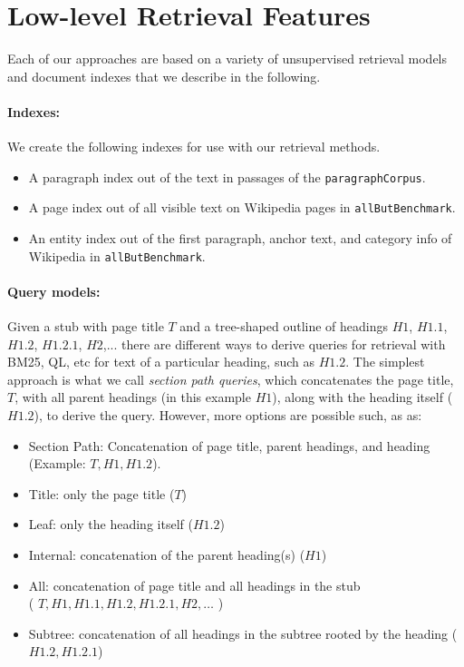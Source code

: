 \documentclass{article}
\begin{document}
\section{Low-level Retrieval Features}
\label{sec:low-level}

Each of our approaches are based on a variety of unsupervised retrieval models and document indexes that we describe in the following.

\paragraph{Indexes:}

We create the following indexes for use with our retrieval methods. 
\begin{itemize}
    \item A paragraph index out of the text in passages of the \texttt{paragraphCorpus}.
    \item A page index out of all visible text on Wikipedia pages in \texttt{allButBenchmark}. 
    \item An entity index out of the first paragraph, anchor text, and category info of Wikipedia in \texttt{allButBenchmark}.
\end{itemize}



\paragraph{Query models:}
Given a stub with page title $T$ and a tree-shaped outline of headings $H1$, $H1.1$, $H1.2$, $H1.2.1$, $H2$,... there are different ways to derive queries for retrieval with BM25, QL, etc for text of a particular heading, such as $H1.2$. The simplest approach is what we call \textit{section path queries}, which concatenates the page title, $T$, with all parent headings (in this example $H1$), along with the heading itself ($H1.2$), to derive the query. However, more options are possible such, as as:

\begin{itemize}
    \item Section Path: Concatenation of page title, parent headings, and heading (Example: $T, H1, H1.2$).
    \item Title: only the page title ($T$)
    \item Leaf: only the heading itself ($H1.2$)
    \item Internal: concatenation of the parent heading(s) ($H1$)
    \item All: concatenation of page title and all headings in the stub \\ ( $T, H1, H1.1, H1.2, H1.2.1, H2, \dots$ )
    \item Subtree: concatenation of all headings in the subtree rooted by the heading ($H1.2, H1.2.1$)
\end{itemize}
\end{document}
